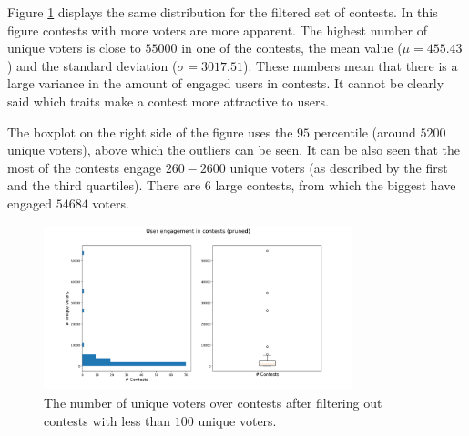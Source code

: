     Figure \ref{user_engagement_in_contests-pruned} displays the same distribution for the filtered set of contests. In this figure contests with more voters are more apparent. The highest number of unique voters is close to $55 000$ in one of the contests, the mean value ($\mu = 455.43$) and the standard deviation ($\sigma = 3 017.51$). These numbers mean that there is a large variance in the amount of engaged users in contests. It cannot be clearly said which traits make a contest more attractive to users.
    
    The boxplot on the right side of the figure uses the $95$ percentile (around $5 200$ unique voters), above which the outliers can be seen. It can be also seen that the most of the contests engage $260-2 600$ unique voters (as described by the first and the third quartiles). There are $6$ large contests, from which the biggest have engaged $54 684$ voters. 

    \begin{figure}[h] 
        \begin{center}
            \includegraphics[width=0.8\textwidth]{Images/user_engagement_in_contests-pruned.png}
            \caption{The number of unique voters over contests after filtering out contests with less than $100$ unique voters.}
            \label{user_engagement_in_contests-pruned}
        \end{center}
    \end{figure}
    
